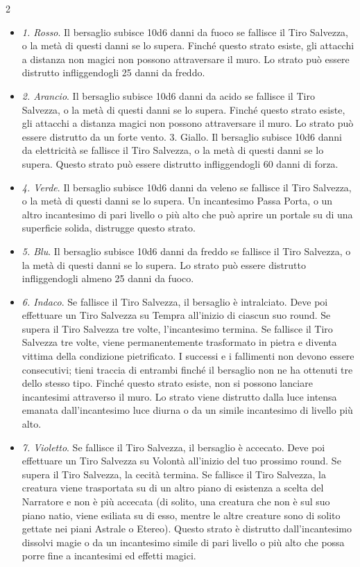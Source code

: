 \begin{multicols}{2}
\begin{itemize}[leftmargin=*] \setlength{\itemsep}{0pt}
	\item \emph{1. Rosso}. Il bersaglio subisce 10d6 danni da fuoco se fallisce il Tiro Salvezza, o la metà di questi danni se lo supera. Finché questo strato esiste, gli attacchi a distanza non magici non possono attraversare il muro. Lo strato può essere distrutto infliggendogli 25 danni da freddo.
	\item \emph{2. Arancio}. Il bersaglio subisce 10d6 danni da acido se fallisce il Tiro Salvezza, o la metà di questi danni se lo supera. Finché questo strato esiste, gli attacchi a distanza magici non possono attraversare il muro. Lo strato può essere distrutto da un forte vento. 3. Giallo. Il bersaglio subisce 10d6 danni da elettricità se fallisce il Tiro Salvezza, o la metà di questi danni se lo supera. Questo strato può essere distrutto infliggendogli 60 danni di forza.
	\item \emph{4. Verde}. Il bersaglio subisce 10d6 danni da veleno se fallisce il Tiro Salvezza, o la metà di questi danni se lo supera. Un incantesimo Passa Porta, o un altro incantesimo di pari livello o più alto che può aprire un portale su di una superficie solida, distrugge questo strato.
	\item \emph{5. Blu}. Il bersaglio subisce 10d6 danni da freddo se fallisce il Tiro Salvezza, o la metà di questi danni se lo supera. Lo strato può essere distrutto infliggendogli almeno 25 danni da fuoco.
	\item \emph{6. Indaco}. Se fallisce il Tiro Salvezza, il bersaglio è intralciato. Deve poi effettuare un Tiro Salvezza su Tempra all'inizio di ciascun suo round. Se supera il Tiro Salvezza tre volte, l'incantesimo termina. Se fallisce il Tiro Salvezza tre volte, viene permanentemente trasformato in pietra e diventa vittima della condizione pietrificato. I successi e i fallimenti non devono essere consecutivi; tieni traccia di entrambi finché il bersaglio non ne ha ottenuti tre dello stesso tipo. Finché questo strato esiste, non si possono lanciare incantesimi attraverso il muro. Lo strato viene distrutto dalla luce intensa emanata dall'incantesimo luce diurna o da un simile incantesimo di livello più alto.
	\item \emph{7. Violetto}. Se fallisce il Tiro Salvezza, il bersaglio è accecato. Deve poi effettuare un Tiro Salvezza su Volontà all'inizio del tuo prossimo round. Se supera il Tiro Salvezza, la cecità termina. Se fallisce il Tiro Salvezza, la creatura viene trasportata su di un altro piano di esistenza a scelta del Narratore e non è più accecata (di solito, una creatura che non è sul suo piano natio, viene esiliata su di esso, mentre le altre creature sono di solito gettate nei piani Astrale o Etereo). Questo strato è distrutto dall'incantesimo dissolvi magie o da un incantesimo simile di pari livello o più alto che possa porre fine a incantesimi ed effetti magici.


\end{itemize}
\end{multicols}
